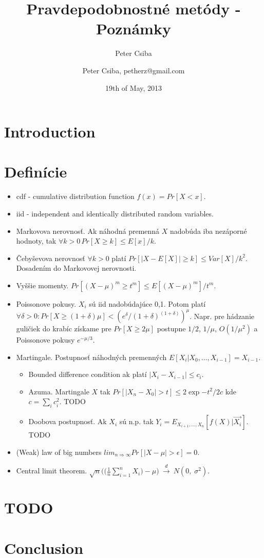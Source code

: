 \documentclass[12pt,a4paper]{article}
\author{Peter Csiba}
\title{Pravdepodobnostné metódy - Poznámky}
\date{19th of May, 2013}
\author{Peter Csiba, petherz@gmail.com}
\begin{document}
\maketitle

\section{Introduction}

\section{Definície}
\begin{itemize} 
  \item cdf - cumulative distribution function $f(x) = Pr[X < x]$. 
  \item iid - independent and identically distributed random variables. 
  \item Markovova nerovnosť. Ak náhodná premenná $X$ nadobúda iba nezáporné hodnoty, tak $\forall k > 0 \, Pr[X \geq k] \leq E[x]/k$.
  \item Čebyševova nerovnosť $\forall k>0$ platí $Pr[|X-E[X]| \geq k] \leq Var[X]/k^2$. Dosadením do Markovovej nerovnosti. 
  \item Vyššie momenty. $Pr[(X-\mu)^m \geq t^m] \leq E[(X - \mu)^m]/t^m$. 
  \item Poissonove pokusy. $X_i$ sú iid nadobúdajúce 0,1. Potom platí $\forall \delta > 0 : Pr[X \geq (1 + \delta)\mu] < (e^\delta/(1 + \delta)^{(1+\delta)})^\mu$. Napr. pre hádzanie guličiek do krabíc získame pre $Pr[X \geq 2\mu]$ postupne $1/2$, $1/\mu$, $O(1/\mu^2)$ a Poissonove pokusy $e^{-\mu/3}$.
  \item Martingale. Postupnosť náhodných premenných $E[X_i | X_0, \ldots, X_{i-1}] = X_{i-1}$.
    \begin{itemize} 
      \item Bounded difference condition ak platí $|X_i - X_{i-1}| \leq c_i$.
      \item Azuma. Martingale $X$ tak $Pr[|X_n - X_0| > t] \leq 2 \exp{-t^2 / 2c}$ kde $c=\sum_i c_i^2$. TODO 
      \item Doobova postupnosť. Ak $X_i$ sú n.p. tak $Y_i = E_{X_{i+1}, \ldots, X_{n}}[f(X) | \overrightarrow{X_i}]$. TODO 
    \end{itemize} 
  \item (Weak) law of big numbers $lim_{n \Rightarrow \infty} Pr[|X - \mu| > \epsilon] = 0$. 
  \item Central limit theorem. $\sqrt{n}\bigg(\bigg(\frac{1}{n}\sum_{i=1}^n X_i\bigg) - \mu\bigg)\ \xrightarrow{d}\ N(0,\;\sigma^2).$ 
\end{itemize} 

\section{TODO}

\section{Conclusion} 
\end{document}
